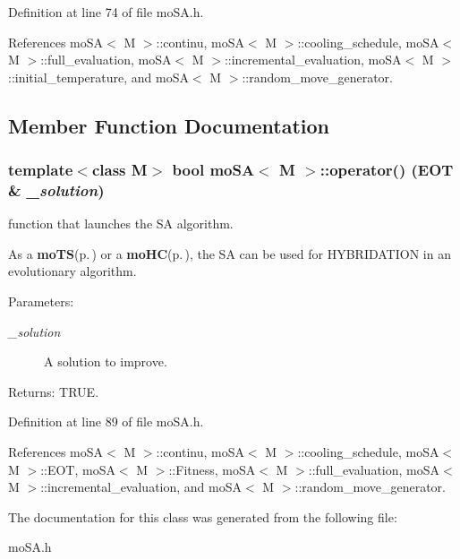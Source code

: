 Definition at line 74 of file mo\-SA.h.

References mo\-SA$<$ M $>$::continu, mo\-SA$<$ M $>$::cooling\_\-schedule, mo\-SA$<$ M $>$::full\_\-evaluation, mo\-SA$<$ M $>$::incremental\_\-evaluation, mo\-SA$<$ M $>$::initial\_\-temperature, and mo\-SA$<$ M $>$::random\_\-move\_\-generator.

\subsection{Member Function Documentation}
\subsubsection{\setlength{\rightskip}{0pt plus 5cm}template$<$class M$>$ bool {\bf mo\-SA}$<$ M $>$::operator() ({\bf EOT} \& {\em \_\-solution})\hspace{0.3cm}{\tt  [inline]}}\label{classmo_s_a_a1}


function that launches the SA algorithm. 

As a {\bf mo\-TS}{\rm (p.\,\pageref{classmo_t_s})} or a {\bf mo\-HC}{\rm (p.\,\pageref{classmo_h_c})}, the SA can be used for HYBRIDATION in an evolutionary algorithm.

\begin{Desc}
\item[Parameters:]
\begin{description}
\item[{\em \_\-solution}]A solution to improve. \end{description}
\end{Desc}
\begin{Desc}
\item[Returns:]TRUE. \end{Desc}


Definition at line 89 of file mo\-SA.h.

References mo\-SA$<$ M $>$::continu, mo\-SA$<$ M $>$::cooling\_\-schedule, mo\-SA$<$ M $>$::EOT, mo\-SA$<$ M $>$::Fitness, mo\-SA$<$ M $>$::full\_\-evaluation, mo\-SA$<$ M $>$::incremental\_\-evaluation, and mo\-SA$<$ M $>$::random\_\-move\_\-generator.

The documentation for this class was generated from the following file:\begin{CompactItemize}
\item 
mo\-SA.h\end{CompactItemize}
